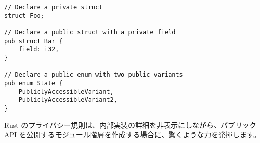 \begin{lstlisting}[numbers=none]
// Declare a private struct
struct Foo;

// Declare a public struct with a private field
pub struct Bar {
    field: i32,
}

// Declare a public enum with two public variants
pub enum State {
    PubliclyAccessibleVariant,
    PubliclyAccessibleVariant2,
}
\end{lstlisting}

Rust のプライバシー規則は、内部実装の詳細を非表示にしながら、パブリック API を公開するモジュール階層を作成する場合に、驚くような力を発揮します。